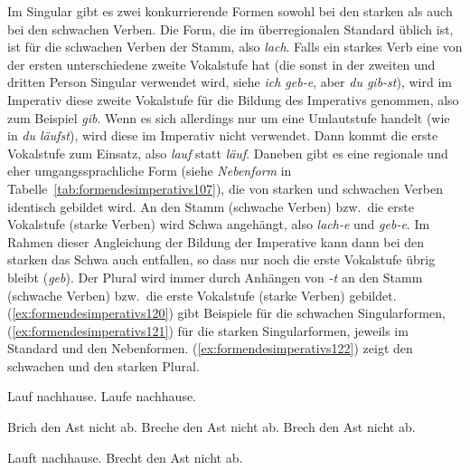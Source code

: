Im Singular gibt es zwei konkurrierende Formen sowohl bei den starken als auch bei den schwachen Verben.
Die Form, die im überregionalen Standard üblich ist, ist für die schwachen Verben der Stamm, also \textit{lach}.
Falls ein starkes Verb eine von der ersten unterschiedene zweite Vokalstufe hat (die sonst in der zweiten und dritten Person Singular verwendet wird, siehe \textit{ich geb-e}, aber \textit{du gib-st}), wird im Imperativ diese zweite Vokalstufe für die Bildung des Imperativs genommen, also zum Beispiel \textit{gib}.
Wenn es sich allerdings nur um eine Umlautstufe handelt (wie in \textit{du läufst}), wird diese im Imperativ nicht verwendet.
Dann kommt die erste Vokalstufe zum Einsatz, also \textit{lauf} statt \textit{\Ast läuf}.
Daneben gibt es eine regionale und eher umgangssprachliche Form (siehe \textit{Nebenform} in Tabelle~\ref{tab:formendesimperativs107}), die von starken und schwachen Verben identisch gebildet wird.
An den Stamm (schwache Verben) bzw.\ die erste Vokalstufe (starke Verben) wird Schwa angehängt, also \textit{lach-e} und \textit{geb-e}.
Im Rahmen dieser Angleichung der Bildung der Imperative kann dann bei den starken das Schwa auch entfallen, so dass nur noch die erste Vokalstufe übrig bleibt (\textit{geb}).
Der Plural wird immer durch Anhängen von \textit{-t} an den Stamm (schwache Verben) bzw.\ die erste Vokalstufe (starke Verben) gebildet.
(\ref{ex:formendesimperativs120}) gibt Beispiele für die schwachen Singularformen, (\ref{ex:formendesimperativs121}) für die starken Singularformen, jeweils im Standard und den Nebenformen.
(\ref{ex:formendesimperativs122}) zeigt den schwachen und den starken Plural.

\begin{exe}
  \ex\label{ex:formendesimperativs120}
    \begin{xlist}
      \ex Lauf nachhause.
      \ex Laufe nachhause.
    \end{xlist}
  \ex\label{ex:formendesimperativs121}
    \begin{xlist}
      \ex Brich den Ast nicht ab.
      \ex Breche den Ast nicht ab.
      \ex Brech den Ast nicht ab.
    \end{xlist}
  \ex\label{ex:formendesimperativs122}
    \begin{xlist}
      \ex Lauft nachhause.
      \ex Brecht den Ast nicht ab.
    \end{xlist}
\end{exe}

